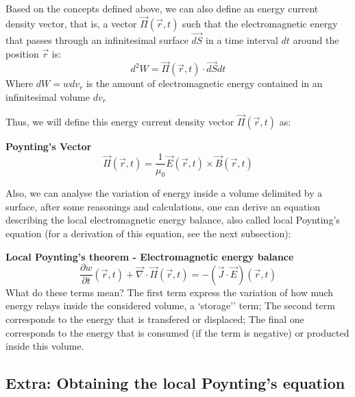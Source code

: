 \documentclass[11pt]{article}
\theoremstyle{definition}
\begin{document}
Based on the concepts defined above, we can also define an energy current density vector, that is, a vector $\vec{\Pi}\left(\vec{r},t\right)$ such that
the electromagnetic energy that passes through an infinitesimal surface $\vec{dS}$ in a time interval $dt$ around the position $\vec{r}$ is:
\begin{equation}
    d^2W = \vec{\Pi}\left(\vec{r},t\right) \cdot \vec{dS}dt
\end{equation}
Where $dW = wdv_{r}$ is the amount of electromagnetic energy contained in an infinitesimal volume $dv_{r}$

Thus, we will define this energy current density vector $\vec{\Pi}\left(\vec{r},t\right)$ as:
\begin{shaded}
    \textbf{Poynting's Vector}
    \begin{equation}
        \vec{\Pi}\left(\vec{r},t\right) = \frac{1}{\mu_{0}}\vec{E}\left(\vec{r},t\right) \times \vec{B}\left(\vec{r},t\right)
    \end{equation}
\end{shaded}

Also, we can analyse the variation of energy inside a volume delimited by a surface, after some reasonings and calculations, one can derive an equation
describing the local electromagnetic energy balance, also called local Poynting's equation (for a derivation of this equation, see the next subsection):
\begin{shaded}
    \textbf{Local Poynting's theorem - Electromagnetic energy balance}
    \begin{equation}
        \frac{\partial w}{\partial t}\left(\vec{r},t\right) + \vec{\nabla} \cdot \vec{\Pi}\left(\vec{r},t\right) = -\left(\vec{J} \cdot \vec{E}\right)\left(\vec{r},t\right)
    \end{equation}
    What do these terms mean?\newline
    \newline
    The first term express the variation of how much energy relays inside the considered volume, a `storage'' term;\newline
    The second term corresponds to the energy that is transfered or displaced;\newline
    The final one corresponds to the energy that is consumed (if the term is negative) or producted inside this volume.
\end{shaded}
\subsection{Extra: Obtaining the local Poynting's equation}
\end{document}
